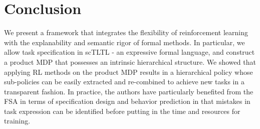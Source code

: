 \documentclass{article}
\begin{document}


\section{Conclusion}
\label{sec:conclusion}

We present a framework that integrates the flexibility of reinforcement learning with the explanability and semantic rigor of formal methods. In particular, we allow task specification in scTLTL - an expressive formal language, and construct a product MDP that possesses an intrinsic hierarchical structure. We showed that applying RL methods on the product MDP results in a hierarchical policy whose sub-policies can be easily extracted and re-combined to achieve new tasks in a transparent fashion. In practice, the authors have particularly benefited from the FSA in terms of specification design and behavior prediction in that mistakes in task expression can be identified before putting in the time and resources for training.  




\end{document}
